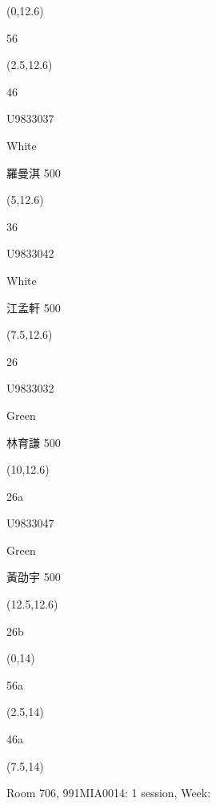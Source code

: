 \documentclass[a4paper]{article}
\newcommand{\myseat}[5]{%
\vspace{-0.1cm}
\parbox[t][2.2cm][t]{3.5cm}{
\small #1 %
\begin{description}
\vspace{-0.1cm}
\item [ID:] #2
\vspace{-0.1cm}
\item [Team:] #3 \normalsize
\vspace{-0.1cm}
\item \normalsize #4 #5
\vspace{-0.1cm}
\end{description}
}
}
\begin{document}
\begin{CJK}{UTF8}{cyberbit}
\begin{textblock}{2.5}(0,12.6)
\textblockcolor{}
\myseat{56}{}{}{}{}
\end{textblock}

\begin{textblock}{2.5}(2.5,12.6)
\myseat{46}{U9833037}{White}{羅曼淇}{500}
\end{textblock}

\begin{textblock}{2.5}(5,12.6)
\myseat{36}{U9833042}{White}{江孟軒}{500}
\end{textblock}

\begin{textblock}{2.5}(7.5,12.6)
\myseat{26}{U9833032}{Green}{林育謙}{500}
\end{textblock}

\begin{textblock}{2.5}(10,12.6)
\myseat{26a}{U9833047}{Green}{黃劭宇}{500}
\end{textblock}

\begin{textblock}{2.5}(12.5,12.6)
\textblockcolor{}
\myseat{26b}{}{}{}{}
\end{textblock}

\begin{textblock}{2.5}(0,14)
\textblockcolor{}
\myseat{56a}{}{}{}{}
\end{textblock}

\begin{textblock}{2.5}(2.5,14)
\textblockcolor{}
\myseat{46a}{}{}{}{}
\end{textblock}

\begin{textblock}{7.5}(7.5,14)
\textblockcolor{}
\parbox[t][2.2cm][t]{9.5cm}{%
\large Room 706, 991MIA0014: 1 session, Week: 
}
\end{textblock}

\end{CJK}
\end{document}

